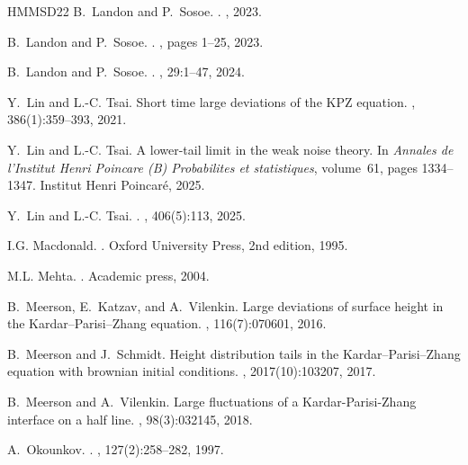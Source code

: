 \documentclass[reqno,11pt]{amsart}
\numberwithin{equation}{section}
\theoremstyle{definition}
\begin{document}
\begin{thebibliography}{HMMSD22}
B.~Landon and P.~Sosoe.
.
, 2023.

B.~Landon and P.~Sosoe.
.
, pages 1--25, 2023.

B.~Landon and P.~Sosoe.
.
, 29:1--47, 2024.

Y.~Lin and L.-C. Tsai.
\newblock Short time large deviations of the {KPZ} equation.
, 386(1):359--393, 2021.

Y.~Lin and L.-C. Tsai.
\newblock A lower-tail limit in the weak noise theory.
\newblock In {\em Annales de l'Institut Henri Poincare (B) Probabilites et statistiques}, volume~61, pages 1334--1347. Institut Henri Poincar{\'e}, 2025.

Y.~Lin and L.-C. Tsai.
.
, 406(5):113, 2025.

I.G. Macdonald.
.
\newblock Oxford University Press, 2nd edition, 1995.

M.L. Mehta.
.
\newblock Academic press, 2004.

B.~Meerson, E.~Katzav, and A.~Vilenkin.
\newblock Large deviations of surface height in the {K}ardar{--P}arisi{--Z}hang equation.
, 116(7):070601, 2016.

B.~Meerson and J.~Schmidt.
\newblock Height distribution tails in the {K}ardar{--P}arisi{--Z}hang equation with brownian initial conditions.
, 2017(10):103207, 2017.

B.~Meerson and A.~Vilenkin.
\newblock Large fluctuations of a {K}ardar{-P}arisi{-Z}hang interface on a half line.
, 98(3):032145, 2018.

A.~Okounkov.
.
, 127(2):258--282, 1997.


\end{thebibliography}
\end{document}
